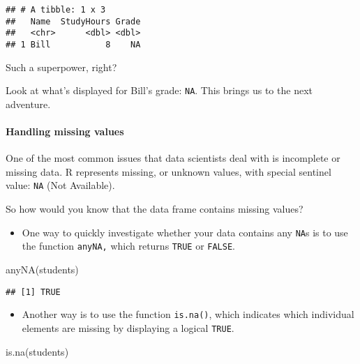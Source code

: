 \documentclass[
]{article}
\newenvironment{Shaded}{\begin{snugshade}}{\end{snugshade}}
\newcommand{\FunctionTok}[1]{\textcolor[rgb]{0.00,0.00,0.00}{#1}}
\newcommand{\NormalTok}[1]{#1}
\providecommand{\tightlist}{%
  \setlength{\itemsep}{0pt}\setlength{\parskip}{0pt}}
\begin{document}
\begin{verbatim}
## # A tibble: 1 x 3
##   Name  StudyHours Grade
##   <chr>      <dbl> <dbl>
## 1 Bill           8    NA
\end{verbatim}

Such a superpower, right?

Look at what's displayed for Bill's grade: \texttt{NA}. This brings us
to the next adventure.

\hypertarget{handling-missing-values}{%
\paragraph{Handling missing values}\label{handling-missing-values}}

One of the most common issues that data scientists deal with is
incomplete or missing data. R represents missing, or unknown values,
with special sentinel value: \texttt{NA} (Not Available).

So how would you know that the data frame contains missing values?

\begin{itemize}
\tightlist
\item
  One way to quickly investigate whether your data contains any
  \texttt{NA}s is to use the function \texttt{anyNA,} which returns
  \texttt{TRUE} or \texttt{FALSE}.
\end{itemize}

\begin{Shaded}
\begin{Highlighting}[]
\FunctionTok{anyNA}\NormalTok{(students)}
\end{Highlighting}
\end{Shaded}

\begin{verbatim}
## [1] TRUE
\end{verbatim}

\begin{itemize}
\tightlist
\item
  Another way is to use the function \texttt{is.na()}, which indicates
  which individual elements are missing by displaying a logical
  \texttt{TRUE}.
\end{itemize}

\begin{Shaded}
\begin{Highlighting}[]
\FunctionTok{is.na}\NormalTok{(students)}
\end{Highlighting}
\end{Shaded}
\end{document}
